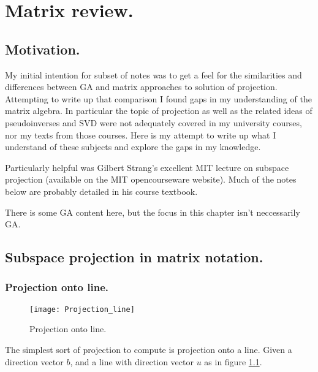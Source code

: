\chapter{Matrix review.}\label{chap:PJMatrixReview}
\date{April 11, 2008.  projectionWithMatrixComparison.tex}

\section{Motivation. }

My initial intention for subset of notes was to get a feel for the similarities and differences between GA and matrix approaches to solution of projection.  Attempting to write up that comparison I found gaps in my understanding of the matrix algebra.  In particular the topic of projection as well as the related ideas of pseudoinverses and SVD were not adequately covered in my university courses, nor my texts from those courses.
Here is my attempt to write up what I understand of these subjects and explore the gaps in my knowledge.

Particularly helpful was 
Gilbert Strang's excellent MIT lecture on subspace projection (available on the MIT opencourseware website).
Much of the notes below are probably detailed in his course textbook.

There is some GA content here, but the focus in this chapter isn't neccessarily GA.

\section{Subspace projection in matrix notation. }

\subsection{Projection onto line. }

\begin{figure}[htp]

\centering
\texttt{[image: Projection\_line]}
\caption{Projection onto line.}\label{fig:Projection_line}
\end{figure}

The simplest sort of projection to compute is projection onto a line.  Given a direction vector $b$, and a line with direction vector $u$
as in figure \ref{fig:Projection_line}.

